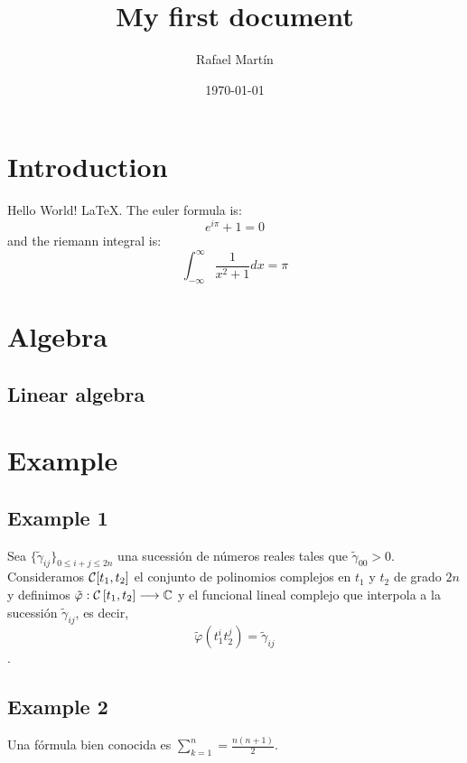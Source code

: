 \documentclass[a4paper,11pt]{article}
\begin{document}
\title{My first document}
\author{Rafael Martín}
\date{\today}
\maketitle

\tableofcontents

\begin{abstract}
\lipsum[2]
\end{abstract}

\section{Introduction}

Hello World! \LaTeX. The euler formula is:
\[e^{i\pi} + 1 = 0\] 
and the riemann integral is:
\[ \int_{-\infty}^{\infty} \frac{1}{x^2 + 1} dx = \pi \]

\section{Algebra}
\lipsum[1]

\subsection{Linear algebra}
\lipsum[1]

\section{Example}
\lipsum[1]
\subsection{Example 1}

Sea $\{\tilde{\gamma}_{ij}\}_{0\leq i+j \leq 2n}$ una sucessión
de números reales tales que $\tilde{\gamma}_{00}>0$. Consideramos 
${\cal C}[t_1,t_2]$ el conjunto de polinomios complejos en $t_1$ y $t_2$
de grado $2n$ y definimos $\tilde{\varphi} : {\cal C} \left[t_1,t_2\right]
\longrightarrow \mathbb{C}$ y el funcional lineal complejo que interpola
a la sucessión $\tilde{\gamma}_{ij}$, es decir,
$$\tilde{\varphi}(t_1^it_2^j) = \tilde{\gamma}_{ij}$$.

\subsection{Example 2}

Una fórmula bien conocida es $\sum_{k=1}^{n}=\frac{n(n+1)}{2}$.
\end{document}
